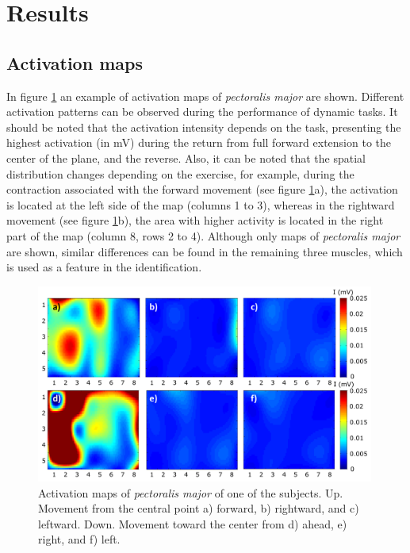 \section{Results}
\subsection{Activation maps}
In figure \ref{fig:4-2} an example of activation maps of \textit{pectoralis major} are shown. Different activation patterns can be observed during the performance of dynamic tasks. It should be noted that the activation intensity depends on the task, presenting the highest activation (in mV) during the return from full forward extension to the center of the plane, and the reverse. Also, it can be noted that the spatial distribution changes depending on the exercise, for example, during the contraction associated with the forward movement (see figure \ref{fig:4-2}a), the activation is located at the left side of the map (columns 1 to 3), whereas in the rightward movement (see figure \ref{fig:4-2}b), the area with higher activity is located in the right part of the map (column 8, rows 2 to 4). Although only maps of \textit{pectoralis major} are shown, similar differences can be found in the remaining three muscles, which is used as a feature in the identification. 

\begin{figure}[ht]
\centering
\includegraphics[width=0.99\textwidth]{Images/figure4_2.png}
\caption{Activation maps of \textit{pectoralis major} of one of the subjects. Up. Movement from the central point a) forward, b) rightward, and c) leftward. Down. Movement toward the center from  d) ahead, e) right, and f) left.}
\label{fig:4-2}
\end{figure}

